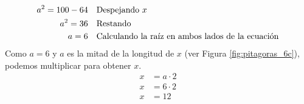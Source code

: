 \begin{solutionbox}{15cm}
\begin{minipage}{0.75\textwidth}
\begin{align*}
            a^2=100-64                                                      & \text{\quad Despejando } x                                    \\
            a^2=36                                                          & \text{\quad Restando}                                         \\
            a=6                                                             & \text{\quad Calculando la raíz en ambos lados de la ecuación} \\
        \end{align*}
        Como $a=6$ y $a$ es la mitad de la longitud de $x$ (ver Figura \ref{fig:pitagoras_6c}), podemos multiplicar para obtener $x$.
        \begin{align*}
            x & = a\cdot 2 \\
            x & = 6\cdot 2 \\
            x & = 12       \\
        \end{align*}
    \end{minipage}
\end{solutionbox}
